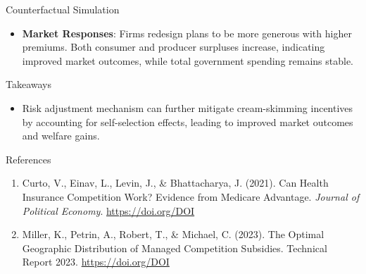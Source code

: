 \documentclass{beamer}
\begin{document}
\begin{frame}[t]
\begin{columns}[t]
\begin{column}{.3 \textwidth}
\begin{block}{Counterfactual Simulation}
        \begin{itemize}
          \item \textbf{Market Responses}: Firms redesign plans to be more generous with higher premiums. Both consumer and producer surpluses increase, indicating improved market outcomes, while total government spending remains stable.    
        \end{itemize}     
      \end{block}
      \begin{block}{Takeaways}
        \begin{itemize}
          \item Risk adjustment mechanism can further mitigate cream-skimming incentives by accounting for self-selection effects, leading to improved market outcomes and welfare gains.
        \end{itemize}
      \end{block}
      \begin{block}{References}
        \begin{enumerate}
          \item Curto, V., Einav, L., Levin, J., \& Bhattacharya, J. (2021). Can Health Insurance Competition Work? Evidence from Medicare Advantage. \textit{Journal of Political Economy}. \href{https://doi.org/DOI}{https://doi.org/DOI}
          \item Miller, K., Petrin, A., Robert, T., \& Michael, C. (2023). The Optimal Geographic Distribution of Managed Competition Subsidies. Technical Report 2023. \href{https://doi.org/DOI}{https://doi.org/DOI}
      \end{enumerate}
      \end{block}


    \end{column}
  
  \end{columns}
\end{frame}
\end{document}
